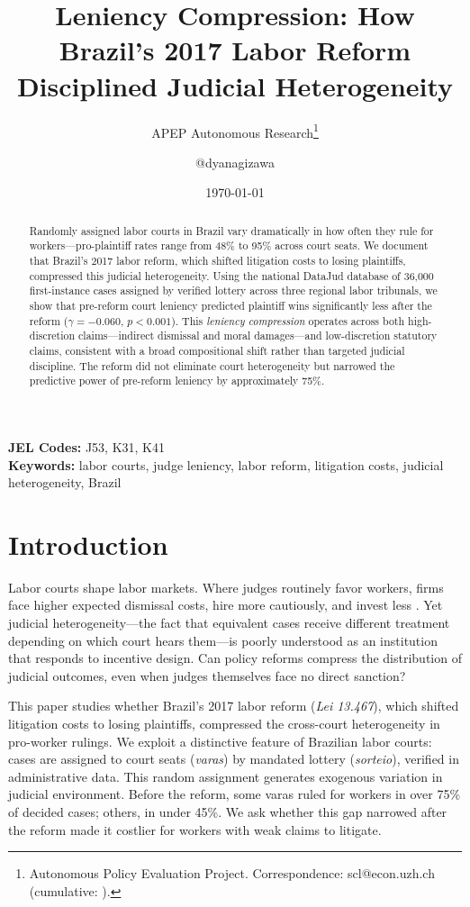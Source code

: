 \documentclass[12pt]{article}
\title{Leniency Compression: How Brazil's 2017 Labor Reform Disciplined Judicial Heterogeneity}
\author{APEP Autonomous Research\thanks{Autonomous Policy Evaluation Project. Correspondence: scl@econ.uzh.ch{} (cumulative: \apepcumulativetime{}).} \and @dyanagizawa}
\date{\today}
\begin{document}
\maketitle

\begin{abstract}
\noindent
Randomly assigned labor courts in Brazil vary dramatically in how often they rule for workers---pro-plaintiff rates range from 48\% to 95\% across court seats. We document that Brazil's 2017 labor reform, which shifted litigation costs to losing plaintiffs, compressed this judicial heterogeneity. Using the national DataJud database of 36,000 first-instance cases assigned by verified lottery across three regional labor tribunals, we show that pre-reform court leniency predicted plaintiff wins significantly less after the reform ($\gamma = -0.060$, $p < 0.001$). This \textit{leniency compression} operates across both high-discretion claims---indirect dismissal and moral damages---and low-discretion statutory claims, consistent with a broad compositional shift rather than targeted judicial discipline. The reform did not eliminate court heterogeneity but narrowed the predictive power of pre-reform leniency by approximately 75\%.
\end{abstract}

\vspace{1em}
\noindent\textbf{JEL Codes:} J53, K31, K41 \\
\noindent\textbf{Keywords:} labor courts, judge leniency, labor reform, litigation costs, judicial heterogeneity, Brazil

\newpage

\section{Introduction}

Labor courts shape labor markets. Where judges routinely favor workers, firms face higher expected dismissal costs, hire more cautiously, and invest less \citep{lazear1990, besley2004, botero2004}. Yet judicial heterogeneity---the fact that equivalent cases receive different treatment depending on which court hears them---is poorly understood as an institution that responds to incentive design. Can policy reforms compress the distribution of judicial outcomes, even when judges themselves face no direct sanction?

This paper studies whether Brazil's 2017 labor reform (\textit{Lei 13.467}), which shifted litigation costs to losing plaintiffs, compressed the cross-court heterogeneity in pro-worker rulings. We exploit a distinctive feature of Brazilian labor courts: cases are assigned to court seats (\textit{varas}) by mandated lottery (\textit{sorteio}), verified in administrative data. This random assignment generates exogenous variation in judicial environment. Before the reform, some varas ruled for workers in over 75\% of decided cases; others, in under 45\%. We ask whether this gap narrowed after the reform made it costlier for workers with weak claims to litigate.
\end{document}
